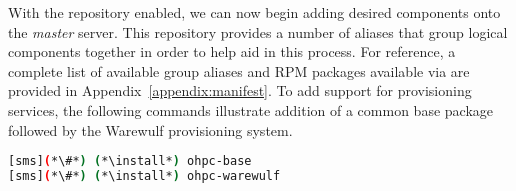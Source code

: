 With the \OHPC{} repository enabled, we can now begin adding desired components onto the
{\em master} server. This repository provides a number of aliases that group
logical components together in order to help aid in this process. For
reference, a complete list of available group aliases and RPM packages available
via \OHPC{} are provided in Appendix~\ref{appendix:manifest}. To add
support for provisioning services, the following commands illustrate addition
of a common base package followed by the Warewulf provisioning system.


\begin{lstlisting}[language=bash,keywords={}]
[sms](*\#*) (*\install*) ohpc-base
[sms](*\#*) (*\install*) ohpc-warewulf
\end{lstlisting}


